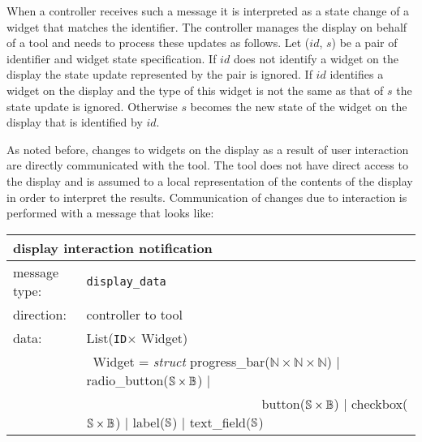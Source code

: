\documentclass{article}
\newcommand{\msg}[1]{\texttt{#1}}
\newcommand{\String}{\ensuremath \mathbb{S}\xspace}
\newcommand{\Id}{\texttt{ID}\xspace}
\begin{document}
   \noindent When a controller receives such a message it is interpreted as a
   state change of a widget that matches the identifier. The controller manages
   the display on behalf of a tool and needs to process these updates as
   follows.  Let ($id$, $s$) be a pair of identifier and widget state
   specification. If $id$ does not identify a widget on the display the state
   update represented by the pair is ignored. If $id$ identifies a
   widget on the display and the type of this widget is not the same as that of
   $s$ the state update is ignored.  Otherwise $s$ becomes the new state of the
   widget on the display that is identified by $id$.

   \pagebreak

   As noted before, changes to widgets on the display as a result of user
   interaction are directly communicated with the tool. The tool does not have
   direct access to the display and is assumed to a local representation of the
   contents of the display in order to interpret the results. Communication of
   changes due to interaction is performed with a message that looks like:

   \begin{table}[H]
    \begin{center}
     \begin{tabular}{|ll|}
      \hline
       \multicolumn{2}{|l|}{\textbf{display interaction notification}} \\
      \hline
       message type:   & \msg{display\_data} \\
      \hline
       direction:      & controller to tool \\
      \hline
       data:           & List(\Id $\times$ Widget) \\
                       & \ Widget = \textit{struct} progress\_bar($\mathbb{N} \times \mathbb{N} \times \mathbb{N}$) $|$
                                                    radio\_button($\String \times \mathbb{B}$) $|$ \\
                       & \ \ \ \ \ \ \ \ \ \ \ \ \ \ \ \ \ \ \ \ \ \ \ \ \ \ \
                                                    button($\String \times \mathbb{B}$) $|$
                                                    checkbox($\String \times \mathbb{B}$) $|$
                                                    label($\String$) $|$
                                                    text\_field($\String$) \\
      \hline
     \end{tabular}
    \end{center}
   \vspace{-0.0cm}
   \end{table}
\end{document}
